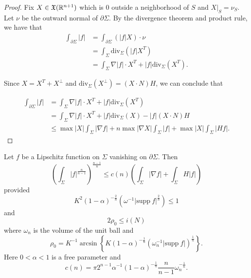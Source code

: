\begin{proof}
    Fix $X \in \mathfrak{X} (\mathbb{R}^{n+1})$ which is 0 outside a neighborhood of $S$ and $X|_S=\nu _S$. Let $\nu$ be the outward normal of $\partial \Sigma $. By the divergence theorem and product rule, we have that
    \begin{equation*}
    \begin{split}
        \int_{\partial \Sigma} \left| f \right| 
        & = \int_{\partial \Sigma} \left(\left| f \right| X \right) \cdot \nu \\
    &=  \int_{\Sigma} \mathrm{div}  _{\Sigma } \left( \left| f \right| X^T \right)  \\
    &= \int_{\Sigma} \nabla \left| f \right| \cdot X^T + \left| f \right| \mathrm{div}  _{\Sigma } (X^T).
    \end{split}
    \end{equation*}

    Since $X=X^T+X^\bot $ and $\mathrm{div}_{\Sigma }(X^\bot)=(X \cdot N)H $, we can conclude that

    \begin{equation*}
        \begin{split}
            \int_{\partial \Sigma} \left| f \right| 
        &= \int_{\Sigma} \nabla \left| f \right| \cdot X^T + \left| f \right| \mathrm{div}  _{\Sigma } (X^T)\\
        &= \int_{\Sigma} \nabla \left| f \right| \cdot X^T + \left| f \right| \mathrm{div}  _{\Sigma } (X) - \left| f \right| \left(X \cdot N \right)H\\
        &\leq \max \left| X \right| \int_{\Sigma} \left| \nabla f \right| + n \max \left| \nabla X \right| \int_{\Sigma} \left| f \right| + \max \left| X \right| \int_{\Sigma} \left| Hf \right| .
        \end{split}
        \end{equation*} 
\end{proof}

\begin{lemma} \label{MSRie}
    Let $f$ be a Lipschitz function on $\Sigma $ vanishing on $\partial \Sigma $. Then
    \[\left( \int_{\Sigma }^{}\left| f \right| ^{\frac{n}{n-1}} \right) ^{\frac{n-1}{n}}\leq c(n)\left( \int_{\Sigma} \left| \nabla f \right| + \int_{\Sigma} H \left| f \right|  \right) \]
    provided
    \[K^2(1-\alpha )^{-\frac{2}{n}}(\omega^{-1}\left| \mathrm{supp} \ f \right| ^{\frac{2}{n}}) \leq 1\]
    and
    \[2 \rho _0 \leq i(N)\]
    where $\omega_n$ is the volume of the unit ball and
    \[\rho_0=K^{-1}\arcsin \left\{ K(1-\alpha )^{-\frac{1}{n}}\left( \omega _n^{-1}\left|\mathrm{supp}\ f  \right|  \right) ^{\frac{1}{n}} \right\}. \]
    Here $0<\alpha<1 $ is a free parameter and
    \[c(n)=\pi 2^{n-1}\alpha ^{-1}\left( 1-\alpha  \right) ^{-\frac{1}{n}} \frac{n}{n-1} \omega _n^{-\frac{1}{n}}.\]
\end{lemma}

